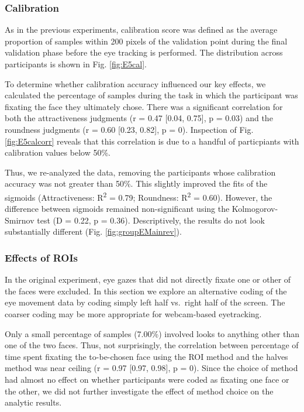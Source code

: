 \documentclass[
  man,floatsintext]{apa6}
\begin{document}
\hypertarget{calibration-5}{%
\subsubsection{Calibration}\label{calibration-5}}

As in the previous experiments, calibration score was defined as the average proportion of samples within 200 pixels of the validation point during the final validation phase before the eye tracking is performed. The distribution across participants is shown in Fig. \ref{fig:E5cal}.


To determine whether calibration accuracy influenced our key effects, we calculated the percentage of samples during the task in which the participant was fixating the face they ultimately chose. There was a significant correlation for both the attractiveness judgments (r = 0.47 {[}0.04, 0.75{]}, p = 0.03) and the roundness judgments (r = 0.60 {[}0.23, 0.82{]}, p = 0). Inspection of Fig. \ref{fig:E5calcorr} reveals that this correlation is due to a handful of particpiants with calibration values below 50\%.



Thus, we re-analyzed the data, removing the participants whose calibration accuracy was not greater than 50\%. This slightly improved the fits of the sigmoids (Attractiveness: R\textsuperscript{2} = 0.79; Roundness: R\textsuperscript{2} = 0.60). However, the difference between sigmoids remained non-significant using the Kolmogorov-Smirnov test (D = 0.22, p = 0.36). Descriptively, the results do not look substantially different (Fig. \ref{fig:groupEMainrev}).



\hypertarget{effects-of-rois-2}{%
\subsubsection{Effects of ROIs}\label{effects-of-rois-2}}

In the original experiment, eye gazes that did not directly fixate one or other of the faces were excluded. In this section we explore an alternative coding of the eye movement data by coding simply left half vs.~right half of the screen. The coarser coding may be more appropriate for webcam-based eyetracking.

Only a small percentage of samples (7.00\%) involved looks to anything other than one of the two faces. Thus, not surprisingly, the correlation between percentage of time spent fixating the to-be-chosen face using the ROI method and the halves method was near ceiling (r = 0.97 {[}0.97, 0.98{]}, p = 0). Since the choice of method had almost no effect on whether participants were coded as fixating one face or the other, we did not further investigate the effect of method choice on the analytic results.
\end{document}

